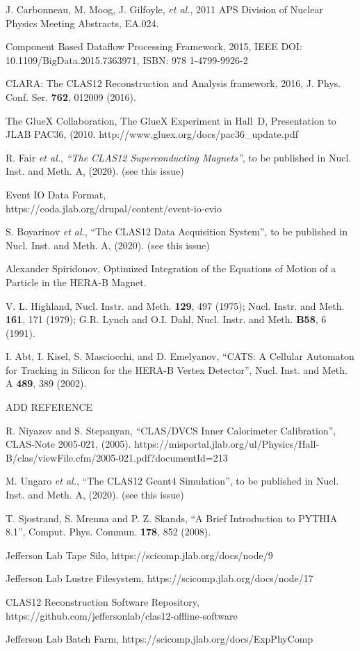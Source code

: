 \documentclass[3p,times,twocolumn]{elsarticle}
\begin{document}
\begin{thebibliography}{99}
J. Carbonneau, M. Moog,  J. Gilfoyle, {\it et al.}, 2011 APS Division of Nuclear Physics Meeting Abstracts, EA.024.

Component Based Dataflow Processing Framework, 2015, IEEE DOI: 10.1109/BigData.2015.7363971,
ISBN: 978 1-4799-9926-2

CLARA: The CLAS12 Reconstruction and Analysis framework, 2016, J. Phys. Conf. Ser. {\bf 762}, 012009 (2016).

The GlueX Collaboration, The GlueX Experiment in Hall~D, Presentation to JLAB PAC36, (2010.
http://www.gluex.org/docs/pac36\_update.pdf

R. Fair {\it et al.}, {\it ``The CLAS12 Superconducting Magnets''}, to be published in Nucl. Inst.
and Meth. A, (2020). (see this issue)

Event IO Data Format, \\ https://coda.jlab.org/drupal/content/event-io-evio

S. Boyarinov {\it et al.}, ``The CLAS12 Data Acquisition System'', to be published in Nucl. Inst. and
Meth. A, (2020). (see this issue)

Alexander Spiridonov, Optimized Integration of the Equations of Motion of a Particle in the HERA-B Magnet.

V. L. Highland, Nucl. Instr. and Meth. {\bf 129}, 497 (1975); Nucl. Instr. and Meth. {\bf 161}, 171 (1979);
G.R. Lynch and O.I. Dahl, Nucl. Instr. and Meth. {\bf B58}, 6 (1991).

I. Abt, I. Kisel, S. Masciocchi, and D. Emelyanov, ``CATS: A Cellular Automaton for Tracking in Silicon for the
HERA-B Vertex Detector'', Nucl. Inst. and Meth. A {\bf 489}, 389 (2002).

ADD REFERENCE

R. Niyazov and S. Stepanyan, ``CLAS/DVCS Inner Calorimeter Calibration'', CLAS-Note 2005-021, (2005).
https://misportal.jlab.org/ul/Physics/Hall-B/clas/viewFile.cfm/2005-021.pdf?documentId=213

M. Ungaro {\it et al.},  ``The CLAS12 Geant4 Simulation'', to be published in Nucl. Inst. and Meth. A, (2020).
(see this issue)

T. Sjostrand, S. Mrenna and P. Z. Skands, ``A Brief Introduction to PYTHIA 8.1'', Comput. Phys. Commun. {\bf 178},
852 (2008).

Jefferson Lab Tape Silo, https://scicomp.jlab.org/docs/node/9

Jefferson Lab Lustre Filesystem, https://scicomp.jlab.org/docs/node/17

CLAS12 Reconstruction Software Repository, https://github.com/jeffersonlab/clas12-offline-software

Jefferson Lab Batch Farm, https://scicomp.jlab.org/docs/ExpPhyComp

\end{thebibliography}
\end{document}
